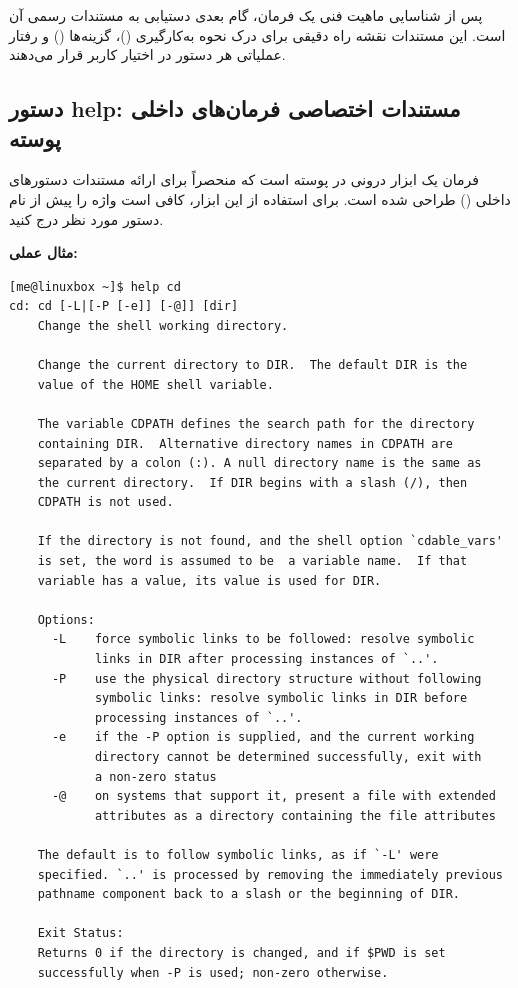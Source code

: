 پس از شناسایی ماهیت فنی یک فرمان، گام بعدی دستیابی به مستندات رسمی آن است. این مستندات نقشه راه دقیقی برای درک نحوه به‌کارگیری ()، گزینه‌ها () و رفتار عملیاتی هر دستور در اختیار کاربر قرار می‌دهند.

\subsection{دستور help: مستندات اختصاصی فرمان‌های داخلی پوسته}

فرمان  یک ابزار درونی در پوسته  است که منحصراً برای ارائه مستندات دستورهای داخلی () طراحی شده است. برای استفاده از این ابزار، کافی است واژه  را پیش از نام دستور مورد نظر درج کنید.

\textbf{مثال عملی:}

\begin{latin}
\begin{lstlisting}
[me@linuxbox ~]$ help cd
cd: cd [-L|[-P [-e]] [-@]] [dir]
    Change the shell working directory.

    Change the current directory to DIR.  The default DIR is the
    value of the HOME shell variable.

    The variable CDPATH defines the search path for the directory
    containing DIR.  Alternative directory names in CDPATH are
    separated by a colon (:). A null directory name is the same as
    the current directory.  If DIR begins with a slash (/), then
    CDPATH is not used.

    If the directory is not found, and the shell option `cdable_vars'
    is set, the word is assumed to be  a variable name.  If that
    variable has a value, its value is used for DIR.

    Options:
      -L    force symbolic links to be followed: resolve symbolic
            links in DIR after processing instances of `..'.
      -P    use the physical directory structure without following
            symbolic links: resolve symbolic links in DIR before
            processing instances of `..'.
      -e    if the -P option is supplied, and the current working
            directory cannot be determined successfully, exit with
            a non-zero status
      -@    on systems that support it, present a file with extended
            attributes as a directory containing the file attributes

    The default is to follow symbolic links, as if `-L' were
    specified. `..' is processed by removing the immediately previous
    pathname component back to a slash or the beginning of DIR.

    Exit Status:
    Returns 0 if the directory is changed, and if $PWD is set
    successfully when -P is used; non-zero otherwise.
\end{lstlisting}
\end{latin}

